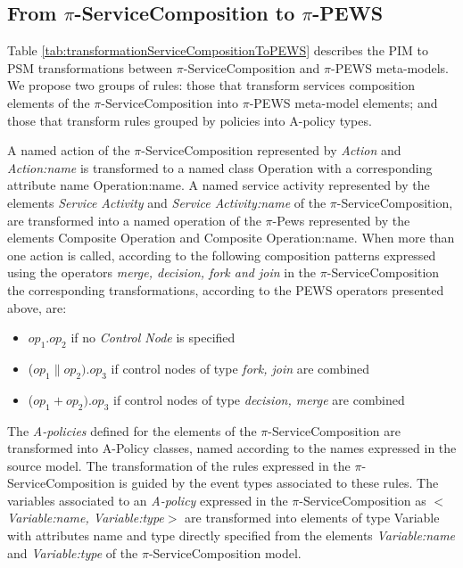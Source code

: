 \subsection{From $\pi$-ServiceComposition to
$\pi$-PEWS}


Table \ref{tab:transformationServiceCompositionToPEWS} describes the PIM to PSM
transformations between $\pi$-ServiceComposition and $\pi$-PEWS meta-models. We
propose two groups of rules: those that transform services composition
elements of the $\pi$-ServiceComposition into $\pi$-PEWS meta-model elements;
and those that transform rules grouped by policies into A-policy types.

A named action of the $\pi$-ServiceComposition represented by  {\sc\em Action}
and {\sc\em Action:name} is transformed to a  named class {\sc Operation} with a
corresponding attribute name {\sc Operation:name}. A  named service activity
represented by the elements {\sc\em Service Activity}  and  {\sc\em
Service Activity:name} of the $\pi$-ServiceComposition, are  transformed into a
named operation of the $\pi$-{\sc Pews} represented by the elements  {\sc
Composite Operation} and {\sc Composite Operation:name}. When more than one action
is called, according to the following  composition patterns expressed using the
operators {\sc\em merge, decision, fork and join} in the $\pi$-ServiceComposition
the corresponding transformations, according to the PEWS operators presented
above, are:
\begin{itemize}
\item   $op_1 . op_2$ if no {\sc\em Control Node} is specified
\item ($op_1 \parallel op_2) . op_3$ if control nodes of type {\sc\em fork, join} are combined
\item ($op_1 + op_2) . op_3$ if control nodes of type {\sc\em decision, merge} are combined
\end{itemize}

The {\em A-policies} defined for the elements of the $\pi$-ServiceComposition are
transformed into {\sc A-Policy} classes, named according to the names expressed
in the source model. The transformation of the rules expressed in the
$\pi$-ServiceComposition is guided by the event types associated to these rules.
The variables associated to an {\em A-policy} expressed in the
$\pi$-ServiceComposition as {\sc\em $<$Variable:name, Variable:type$>$} are
transformed into elements of type {\sc Variable} with attributes {\sc name} and
{\sc type} directly specified from the elements {\sc\em  Variable:name} and
{\sc\em Variable:type} of the $\pi$-ServiceComposition model.


